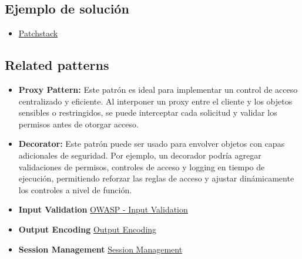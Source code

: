 \subsection*{Ejemplo de solución}

\begin{itemize}
    \item \href{https://patchstack.com/academy/wordpress/securing-code/broken-access-control/}{Patchstack}
\end{itemize}

\subsection*{Related patterns}

\begin{itemize} 
\item \textbf{Proxy Pattern: }Este patrón es ideal para implementar un control de acceso centralizado y eficiente. Al interponer un proxy entre el cliente y los objetos sensibles o restringidos, se puede interceptar cada solicitud y validar los permisos antes de otorgar acceso.
\item \textbf{Decorator: }Este patrón puede ser usado para envolver objetos con capas adicionales de seguridad. Por ejemplo, un decorador podría agregar validaciones de permisos, controles de acceso y logging en tiempo de ejecución, permitiendo reforzar las reglas de acceso y ajustar dinámicamente los controles a nivel de función.
\item \textbf{Input Validation} 
\href{https://cheatsheetseries.owasp.org/cheatsheets/Input_Validation_Cheat_Sheet.html}{OWASP - Input Validation}
\item \textbf{Output Encoding}
\href{https://qwiet.ai/appsec-101-output-encoding/}{Output Encoding}
\item \textbf{Session Management}
\href{https://cheatsheetseries.owasp.org/cheatsheets/Session_Management_Cheat_Sheet.html}{Session Management}
\end{itemize}
